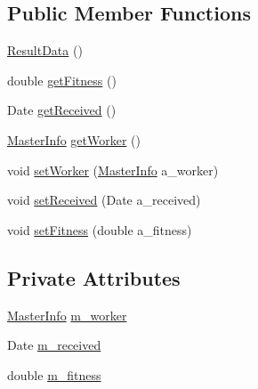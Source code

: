 \subsection*{Public Member Functions}
\begin{DoxyCompactItemize}
\item 
\hyperlink{classorg_1_1jgap_1_1distr_1_1grid_1_1common_1_1_result_data_a45b48271186378ee1dcefdb8082a8d19}{Result\-Data} ()
\item 
double \hyperlink{classorg_1_1jgap_1_1distr_1_1grid_1_1common_1_1_result_data_a8a13ef4a5fc2960dc0ca5e5d799e24f7}{get\-Fitness} ()
\item 
Date \hyperlink{classorg_1_1jgap_1_1distr_1_1grid_1_1common_1_1_result_data_a420de7232f7100712b43c9be787387ba}{get\-Received} ()
\item 
\hyperlink{classorg_1_1jgap_1_1distr_1_1_master_info}{Master\-Info} \hyperlink{classorg_1_1jgap_1_1distr_1_1grid_1_1common_1_1_result_data_adc80c1bb17d22f48bb1bfbeabe1836d0}{get\-Worker} ()
\item 
void \hyperlink{classorg_1_1jgap_1_1distr_1_1grid_1_1common_1_1_result_data_a0d21202e19d85bb99ad4626d4cbd854d}{set\-Worker} (\hyperlink{classorg_1_1jgap_1_1distr_1_1_master_info}{Master\-Info} a\-\_\-worker)
\item 
void \hyperlink{classorg_1_1jgap_1_1distr_1_1grid_1_1common_1_1_result_data_a34046cdc4123cc9789e24c0385364d51}{set\-Received} (Date a\-\_\-received)
\item 
void \hyperlink{classorg_1_1jgap_1_1distr_1_1grid_1_1common_1_1_result_data_ae51018e74ae921685b27a8324fe4e663}{set\-Fitness} (double a\-\_\-fitness)
\end{DoxyCompactItemize}
\subsection*{Private Attributes}
\begin{DoxyCompactItemize}
\item 
\hyperlink{classorg_1_1jgap_1_1distr_1_1_master_info}{Master\-Info} \hyperlink{classorg_1_1jgap_1_1distr_1_1grid_1_1common_1_1_result_data_a69e9a3629a5b82f86a8e4266cd728493}{m\-\_\-worker}
\item 
Date \hyperlink{classorg_1_1jgap_1_1distr_1_1grid_1_1common_1_1_result_data_a61f93e2462d77580b70bc2f2303957c3}{m\-\_\-received}
\item 
double \hyperlink{classorg_1_1jgap_1_1distr_1_1grid_1_1common_1_1_result_data_a0918e2f3f8abc3db1101d66518104fff}{m\-\_\-fitness}
\end{DoxyCompactItemize}
